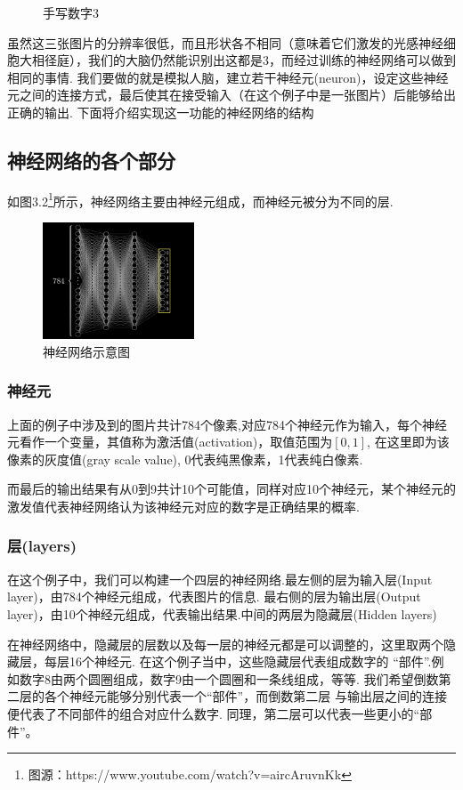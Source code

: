 \documentclass[UTF8]{ctexbook}
\begin{document}
\begin{figure}[h]
{\begin{minipage}[b]{.3\linewidth}
        \end{minipage}
    }
    \caption{手写数字3}
\end{figure}

虽然这三张图片的分辨率很低，而且形状各不相同（意味着它们激发的光感神经细胞大相径庭），我们的大脑仍然能识别出这都是3，而经过训练的神经网络可以做到相同的事情.
我们要做的就是模拟人脑，建立若干神经元(neuron)，设定这些神经元之间的连接方式，最后使其在接受输入（在这个例子中是一张图片）后能够给出正确的输出.
下面将介绍实现这一功能的神经网络的结构
\subsection{神经网络的各个部分}
如图3.2\footnote{图源：https://www.youtube.com/watch?v=aircAruvnKk}所示，神经网络主要由神经元组成，而神经元被分为不同的层.
\begin{figure}[h]
    \centering
    \includegraphics[width=0.4\textwidth]{neural network.png}
    \caption{神经网络示意图}
\end{figure}
\subsubsection{神经元}
上面的例子中涉及到的图片共计784个像素,对应784个神经元作为输入，每个神经元看作一个变量，其值称为激活值(activation)，取值范围为$[0,1]$,
在这里即为该像素的灰度值(gray scale value), 0代表纯黑像素，1代表纯白像素.

而最后的输出结果有从0到9共计10个可能值，同样对应10个神经元，某个神经元的激发值代表神经网络认为该神经元对应的数字是正确结果的概率.
\subsubsection{层(layers)}
在这个例子中，我们可以构建一个四层的神经网络.最左侧的层为输入层(Input layer)，由784个神经元组成，代表图片的信息.
最右侧的层为输出层(Output layer)，由10个神经元组成，代表输出结果.中间的两层为隐藏层(Hidden layers)

在神经网络中，隐藏层的层数以及每一层的神经元都是可以调整的，这里取两个隐藏层，每层16个神经元. 在这个例子当中，这些隐藏层代表组成数字的
“部件”.例如数字8由两个圆圈组成，数字9由一个圆圈和一条线组成，等等. 我们希望倒数第二层的各个神经元能够分别代表一个“部件”，而倒数第二层
与输出层之间的连接便代表了不同部件的组合对应什么数字. 同理，第二层可以代表一些更小的“部件”。
\end{document}
